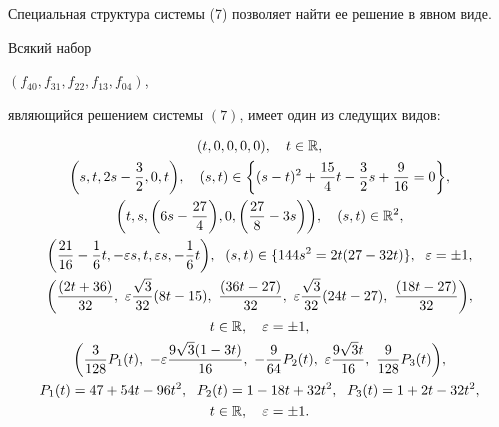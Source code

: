 Специальная структура системы (7) позволяет найти ее решение в явном виде.





\begin{prop}


Всякий набор


$(f_{40}, f_{31}, f_{22}, f_{13}, f_{04})$,


являющийся решением системы $(7)$, имеет один из следущих видов$:$


\begin{gather}


(t, 0, 0, 0 , 0), \quad t \in \Bbb R, \\


%


\bigg(s, t, 2s - \frac32, 0, t \bigg), \quad (s,t) \in \bigg\{(s-t)^2+


\frac{15}4 t - \frac32 s+\frac9{16}=0 \bigg\}, \\


%


\bigg(t, s , \bigg(6 s-\frac{27}4 \bigg),


0, \bigg(\frac{27}8 - 3 s \bigg) \bigg),


\quad (s,t) \in \Bbb R^2, \\


%


\bigg(\frac{21}{16} -\frac16 t, -\varepsilon s, t, \varepsilon s,


 - \frac16 t \bigg),


\ \; (s,t) \in \{144 s^2=2t (27 - 32 t) \},\ \; \varepsilon=\pm 1, \\


%


\bigg(\frac{(2t+36)}{32},\ \varepsilon \frac{\sqrt{3}}{32} (8t - 15),


\ \frac{(36 t - 27)}{32},


\ \varepsilon \frac{\sqrt{3}}{32} (24 t - 27),


\ \frac{(18 t - 27)}{32} \bigg),\notag \\


%


t \in \Bbb R, \quad \varepsilon=\pm 1, \\


%


\bigg(\frac3{128} P_1(t),\ - \varepsilon


\frac{9 \sqrt{3}(1 - 3 t)}{16},\ - \frac9{64} P_2(t),


\ \varepsilon \frac{9 \sqrt{3} t}{16},


\ \frac9{128} P_3(t) \bigg), \notag \\


%


P_1(t)=47+54 t - 96 t^2, \ \;


P_2(t)=1 - 18 t+32 t^2, \ \;


P_3(t)=1+2 t - 32 t^2, \notag \\


%


t \in \Bbb R, \quad \varepsilon=\pm 1.


\end{gather}


\end{prop}
